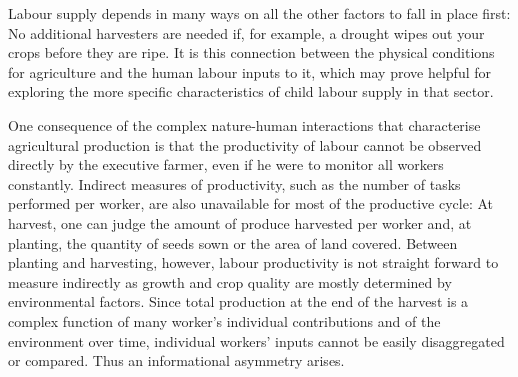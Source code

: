 \documentclass[a4paper,12pt]{article}
\theoremstyle{plain}
\theoremstyle{definition}
\theoremstyle{definition}
\theoremstyle{definition}
\theoremstyle{definition}
\begin{document}
Labour supply depends in many ways on all the other factors to fall in place first: No additional harvesters are needed if, for example, a drought wipes out your crops before they are ripe. It is this connection between the physical conditions for agriculture and the human labour inputs to it, which may prove helpful for exploring the more specific characteristics of child labour supply in that sector. 

One consequence of the complex nature-human interactions that characterise agricultural production is that the productivity of labour cannot be observed directly by the executive farmer, even if he were to monitor all workers constantly. Indirect measures of productivity, such as the number of tasks performed per worker, are also unavailable for most of the productive cycle: At harvest, one can judge the amount of produce harvested per worker and, at planting, the quantity of seeds sown or the area of land covered. Between planting and harvesting, however, labour productivity is not straight forward to measure indirectly as growth and crop quality are mostly determined by environmental factors. Since total production at the end of the harvest is a complex function of many worker's individual contributions and of the environment over time, individual workers' inputs cannot be easily disaggregated or compared. Thus an informational asymmetry arises. 

\end{document}
